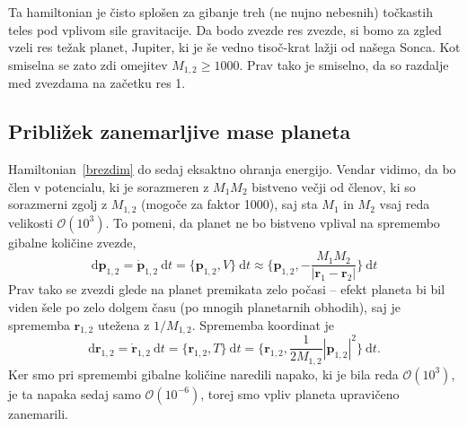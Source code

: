 \documentclass[12pt, a4paper]{article}
\renewcommand{\r}{
    \ensuremath{\mathbf{r}}
}
\newcommand{\p}{
    \ensuremath{\mathbf{p}}
}
\newcommand{\sfrac}[2]{
    \ensuremath{\textstyle{\frac{#1}{#2}}}
}
\renewcommand{\d}{
    \ensuremath{\mathrm{d}}
}
\begin{document}
Ta hamiltonian je \v cisto splo\v sen za gibanje treh (ne nujno nebesnih) to\v ckastih teles pod vplivom sile
gravitacije. Da bodo zvezde res zvezde, si bomo za zgled vzeli res te\v zak planet, Jupiter, ki je \v se
vedno tiso\v c-krat la\v zji od na\v sega Sonca. Kot smiselna se zato zdi omejitev $M_{1,2} \geq 1000$.
Prav tako je smiselno, da so razdalje med zvezdama na za\v cetku res 1.

\subsection{Pribli\v zek zanemarljive mase planeta}

Hamiltonian~\eqref{brezdim} do sedaj eksaktno ohranja energijo. Vendar vidimo, da bo \v clen v potencialu, ki je
sorazmeren z $M_1 M_2$ bistveno ve\v cji od \v clenov, ki so sorazmerni zgolj z $M_{1,2}$ (mogo\v ce za faktor 1000),
saj sta $M_1$ in $M_2$ vsaj reda velikosti $\mathcal{O}(10^3)$. To pomeni, da planet ne bo bistveno vplival na
spremembo gibalne koli\v cine zvezde,
\begin{equation}
    \d\p_{1,2} = \dot{\p}_{1,2}\ \d t = \{\p_{1,2}, V\}\ \d t \approx
        \Big\{\p_{1,2}, -\sfrac{M_1M_2}{|\r_1 - \r_2|}\Big\}\ \d t
\end{equation}
Prav tako se zvezdi glede na planet premikata zelo po\v casi -- efekt planeta bi bil viden \v sele po zelo dolgem
\v casu (po mnogih planetarnih obhodih), saj je sprememba $\r_{1,2}$ ute\v zena z $1/M_{1,2}$. Sprememba koordinat
je
\begin{equation}
    \d \r_{1,2} = \dot{\r}_{1,2}\ \d t = \{\r_{1,2}, T\}\ \d t = \big\{\r_{1,2}, \sfrac{1}{2M_{1,2}}|\p_{1,2}|^2\big\}\ \d t.
\end{equation}
Ker smo pri spremembi gibalne koli\v cine naredili napako, ki je bila reda $\mathcal{O}(10^3)$, je ta napaka sedaj
samo $\mathcal{O}(10^{-6})$, torej smo vpliv planeta upravi\v ceno zanemarili.
\end{document}
